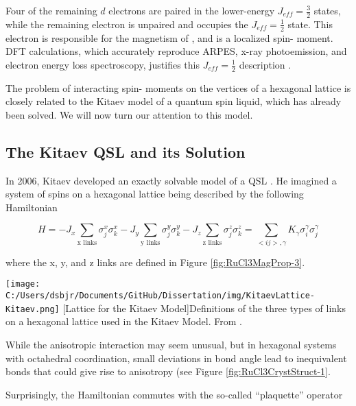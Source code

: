 Four of the remaining $d$ electrons are paired in the  lower-energy $J_{eff} = \frac{3}{2}$ states, while the remaining electron is unpaired and occupies the $J_{eff} = \frac{1}{2}$ state. This electron is responsible for the magnetism of \ruclnospace, and is a localized spin-\textonehalf{} moment. DFT calculations, which accurately reproduce ARPES, x-ray photoemission, and electron energy loss spectroscopy, justifies this $J_{eff} = \frac{1}{2}$ description \cite{Koitzsch2016}.

The problem of interacting spin-\textonehalf{} moments on the vertices of a hexagonal lattice is closely related to the Kitaev model of a quantum spin liquid, which has already been solved. We will now turn our attention to this model.

\subsection{The Kitaev QSL and its Solution}

In 2006, Kitaev developed an exactly solvable model of a QSL \cite{Kitaev2006}. He imagined a system of spins on a hexagonal lattice being described by the following Hamiltonian

\begin{equation}
H = -J_{x} \sum_{\text{x links}} \sigma_{j}^{x} \sigma_{k}^{x} -J_{y} \sum_{\text{y links}} \sigma_{j}^{y} \sigma_{k}^{y} -J_{z} \sum_{\text{z links}} \sigma_{j}^{z} \sigma_{k}^{z} = \sum_{<ij>,\gamma}K_{\gamma}\sigma_{i}^{\gamma}\sigma_{j}^{\gamma}
\end{equation}

where the x, y, and z links are defined in Figure \ref{fig:RuCl3MagProp-3}.

\begin{centering}
\texttt{[image: C:/Users/dsbjr/Documents/GitHub/Dissertation/img/KitaevLattice-Kitaev.png]}
  \captionsetup{width=0.75\textwidth}
  [Lattice for the Kitaev Model]{Definitions of the three types of links on a hexagonal lattice used in the Kitaev Model. From \cite{Kitaev2006}.} 
  \label{fig:RuCl3MagProp-3}
\end{centering}

While the anisotropic interaction may seem unusual, but in hexagonal systems with octahedral coordination, small deviations in bond angle lead to inequivalent bonds that could give rise to anisotropy (see Figure \ref{fig:RuCl3CrystStruct-1}.

Surprisingly, the Hamiltonian commutes with the so-called ``plaquette'' operator


